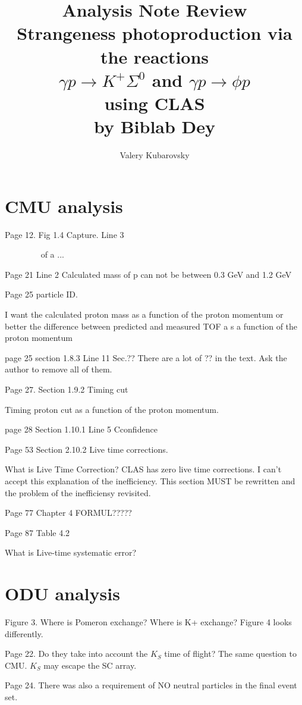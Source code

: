 \documentclass[11pt]{amsart}
\title{Analysis Note Review\\
Strangeness photoproduction via the reactions\\
$\gamma p\to K^+\Sigma^0$ and $\gamma p\to \phi p$\\
using CLAS\\
by Biblab Dey}
\author{Valery Kubarovsky}
\date{}                                           %
\begin{document}
\maketitle
\section{CMU analysis}
Page 12. Fig 1.4 Capture. Line 3 

~~~~~~~~    of a ...


Page 21 Line 2  Calculated mass of p can not be between 0.3 GeV and 1.2 GeV

Page 25 particle ID.

I want the calculated proton mass as a function of the proton momentum
or better the difference between predicted and measured TOF a s a function of the proton momentum

page 25 section 1.8.3 Line 11 Sec.??
There are a lot of ?? in the text. Ask the author to remove all of them.

Page 27. Section 1.9.2 Timing cut

Timing proton cut as a function of the proton momentum.


page 28 Section 1.10.1 Line 5 Cconfidence


Page 53 Section 2.10.2 Live time corrections.

What is Live Time Correction? CLAS has zero live time corrections.
I can't accept this explanation of the inefficiency. This section MUST be rewritten 
and the problem of the inefficiensy revisited.

Page 77 Chapter 4   FORMUL?????

Page 87 Table 4.2

What is Live-time systematic error?

\section{ODU analysis}

Figure 3. Where is Pomeron exchange? Where is K+ exchange?
Figure 4 looks differently.

Page 22. Do they take into account the $K_S$ time of flight? The same question to CMU.
$K_S$ may escape the SC array.

Page 24. There was also a requirement of NO neutral particles in the final event set.
\end{document}
